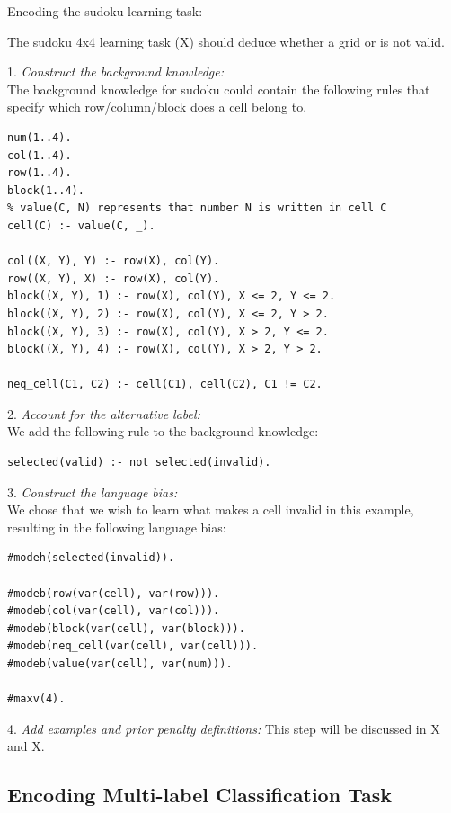 \begin{example}
\label{sudoku-binary-example}
Encoding the sudoku learning task:

The sudoku 4x4 learning task (X) should deduce whether a grid or is not valid.

1. \textit{Construct the background knowledge:} \\
The background knowledge for sudoku could contain the following rules that specify which row/column/block does a cell belong to.
\begin{verbatim}
num(1..4).
col(1..4).
row(1..4).
block(1..4).
% value(C, N) represents that number N is written in cell C
cell(C) :- value(C, _).

col((X, Y), Y) :- row(X), col(Y).
row((X, Y), X) :- row(X), col(Y).
block((X, Y), 1) :- row(X), col(Y), X <= 2, Y <= 2.
block((X, Y), 2) :- row(X), col(Y), X <= 2, Y > 2.
block((X, Y), 3) :- row(X), col(Y), X > 2, Y <= 2.
block((X, Y), 4) :- row(X), col(Y), X > 2, Y > 2.

neq_cell(C1, C2) :- cell(C1), cell(C2), C1 != C2.
\end{verbatim}

2. \textit{Account for the alternative label:} \\
We add the following rule to the background knowledge:
\begin{verbatim}
selected(valid) :- not selected(invalid). 
\end{verbatim}

3. \textit{Construct the language bias:} \\
We chose that we wish to learn what makes a cell invalid in this example, resulting in the following language bias:
\begin{verbatim}
#modeh(selected(invalid)).

#modeb(row(var(cell), var(row))).
#modeb(col(var(cell), var(col))).
#modeb(block(var(cell), var(block))).
#modeb(neq_cell(var(cell), var(cell))).
#modeb(value(var(cell), var(num))).

#maxv(4).
\end{verbatim}

4. \textit{Add examples and prior penalty definitions:}
This step will be discussed in X and X.
\end{example}

\subsection{Encoding Multi-label Classification Task}

